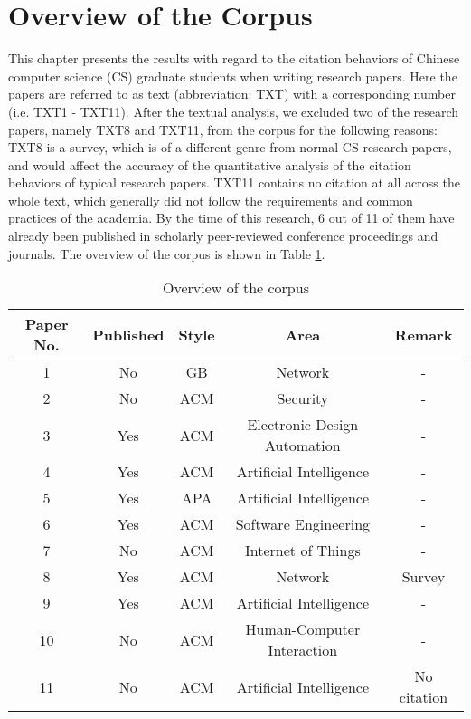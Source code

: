 \label{chap:results}

\section{Overview of the Corpus}
This chapter presents the results with regard to the citation behaviors of Chinese computer science (CS) graduate students when writing research papers. Here the papers are referred to as text (abbreviation: TXT) with a corresponding number (i.e. TXT1 - TXT11). After the textual analysis, we excluded two of the research papers, namely TXT8 and TXT11, from the corpus for the following reasons: TXT8 is a survey, which is of a different genre from normal CS research papers, and would affect the accuracy of the quantitative analysis of the citation behaviors of typical research papers. TXT11 contains no citation at all across the whole text, which generally did not follow the requirements and common practices of the academia. By the time of this research, 6 out of 11 of them have already been published in scholarly peer-reviewed conference proceedings and journals. The overview of the corpus is shown in Table \ref{tab:corpus_overview}.

\begin{table}[htbp]
    \caption{Overview of the corpus}
    \centering
      \begin{tabular}{ccccc}
        \toprule[1.5pt]
        \textbf{Paper No.} & \textbf{Published} & \textbf{Style} & \textbf{Area} & \textbf{Remark} \\
        \midrule[1pt]
        1   &No&GB&Network&-\\
        2	&No	&ACM	&Security	&-\\
        3	&Yes	&ACM	&Electronic Design Automation	&-\\
        4	&Yes	&ACM	&Artificial Intelligence	&-\\
        5	&Yes	&APA	&Artificial Intelligence	&-\\
        6	&Yes	&ACM	&Software Engineering&	-\\
        7	&No	&ACM	&Internet of Things	&-\\
        8	&Yes	&ACM	&Network	&Survey\\
        9	&Yes	&ACM	&Artificial Intelligence	&-\\
        10	&No	&ACM	&Human-Computer Interaction	&-\\
        11	&No	&ACM	&Artificial Intelligence	&No citation\\
        
      \bottomrule[1.5pt]
    \end{tabular}
    \label{tab:corpus_overview}
  \end{table}

